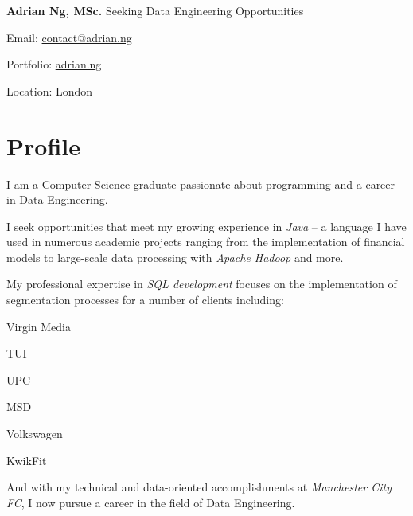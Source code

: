 \documentclass[letterpaper,11pt]{article}
\begin{document}
\noindent
\Large
\textbf{Adrian Ng, MSc.}
\newline
\small
Seeking Data Engineering Opportunities
\newline
\begin{description*}
	\item[Email:] \href{mailto:contact@adrian.ng}{contact@adrian.ng}
	\item[Portfolio:] \href{https://adrian.ng}{adrian.ng}
	\item[Location:] London
\end{description*}
\hfill
\vspace{0.25cm}
\noindent
\begin{minipage}[t]{0.5\linewidth}
	\section{Profile}
	\quad
	I am a Computer Science graduate passionate about programming and a career in Data Engineering.
	\par\quad
	I seek opportunities that meet my growing experience in \textit{Java} -- a language I have used in numerous academic projects ranging from the implementation of financial models to large-scale data processing with \textit{Apache Hadoop} and more.
	\par\quad
	My professional expertise in \textit{SQL development} focuses on the implementation of segmentation processes for a number of clients including:
	\begin{itemize*}
		\item Virgin Media
		\item TUI
		\item UPC
		\item MSD
		\item Volkswagen
		\item KwikFit
	\end{itemize*}
	\par\quad
	And with my technical and data-oriented accomplishments at \textit{Manchester City FC}, I now pursue a career in the field of Data Engineering.
\end{minipage}
\hspace{0.2cm}
\end{document}
